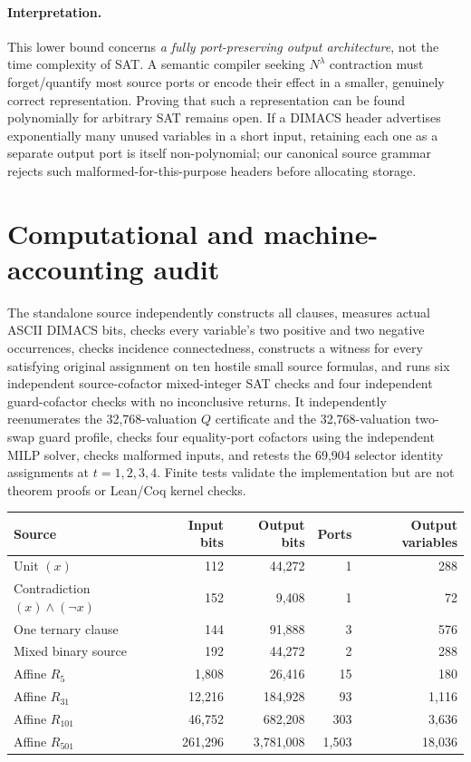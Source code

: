 \documentclass[11pt]{article}
\begin{document}
\paragraph{Interpretation.} This lower bound concerns \emph{a fully port-preserving output architecture}, not the time complexity of SAT. A semantic compiler seeking $N^\lambda$ contraction must forget/quantify most source ports or encode their effect in a smaller, genuinely correct representation. Proving that such a representation can be found polynomially for arbitrary SAT remains open. If a DIMACS header advertises exponentially many unused variables in a short input, retaining each one as a separate output port is itself non-polynomial; our canonical source grammar rejects such malformed-for-this-purpose headers before allocating storage.

\section{Computational and machine-accounting audit}
The standalone source  independently constructs all clauses, measures actual ASCII DIMACS bits, checks every variable's two positive and two negative occurrences, checks incidence connectedness, constructs a witness for every satisfying original assignment on ten hostile small source formulas, and runs six independent source-cofactor mixed-integer SAT checks and four independent guard-cofactor checks with no inconclusive returns. It independently reenumerates the 32,768-valuation $Q$ certificate and the 32,768-valuation two-swap guard profile, checks four equality-port cofactors using the independent MILP solver, checks malformed inputs, and retests the 69,904 selector identity assignments at $t=1,2,3,4$. Finite tests validate the implementation but are not theorem proofs or Lean/Coq kernel checks.

\begin{center}\begin{tabular}{lrrrr}\toprule
Source & Input bits & Output bits & Ports & Output variables\\\midrule
Unit $(x)$ &112&44,272&1&288\\
Contradiction $(x)\land(\neg x)$ &152&9,408&1&72\\
One ternary clause &144&91,888&3&576\\
Mixed binary source &192&44,272&2&288\\
Affine $R_5$ &1,808&26,416&15&180\\
Affine $R_{31}$ &12,216&184,928&93&1,116\\
Affine $R_{101}$ &46,752&682,208&303&3,636\\
Affine $R_{501}$ &261,296&3,781,008&1,503&18,036\\\bottomrule\end{tabular}\end{center}
\end{document}
